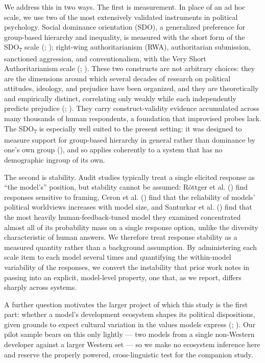 \documentclass[
]{article}
\begin{document}
We address this in two ways. The first is measurement. In place of an ad
hoc scale, we use two of the most extensively validated instruments in
political psychology. Social dominance orientation (SDO), a generalized
preference for group-based hierarchy and inequality, is measured with
the short form of the SDO\textsubscript{7} scale
(;
); right-wing
authoritarianism (RWA), authoritarian submission, sanctioned aggression,
and conventionalism, with the Very Short Authoritarianism scale
(;
). These two
constructs are not arbitrary choices: they are the dimensions around
which several decades of research on political attitudes, ideology, and
prejudice have been organized, and they are theoretically and
empirically distinct, correlating only weakly while each independently
predicts prejudice (;
). They carry
construct-validity evidence accumulated across many thousands of human
respondents, a foundation that improvised probes lack. The
SDO\textsubscript{7} is especially well suited to the present setting:
it was designed to measure support for group-based hierarchy in general
rather than dominance by one's own group (), and so applies coherently to a system that has no
demographic ingroup of its own.

The second is stability. Audit studies typically treat a single elicited
response as ``the model's'' position, but stability cannot be assumed:
Röttger et al. () find responses
sensitive to framing, Ceron et al. () find
that the reliability of models' political worldviews increases with
model size, and Santurkar et al. ()
find that the most heavily human-feedback-tuned model they examined
concentrated almost all of its probability mass on a single response
option, unlike the diversity characteristic of human answers. We
therefore treat response stability as a measured quantity rather than a
background assumption. By administering each scale item to each model
several times and quantifying the within-model variability of the
responses, we convert the instability that prior work notes in passing
into an explicit, model-level property, one that, as we report, differs
sharply across systems.

A further question motivates the larger project of which this study is
the first part: whether a model's development ecosystem shapes its
political dispositions, given grounds to expect cultural variation in
the values models express (;
). Our pilot sample bears on
this only lightly --- two models from a single non-Western developer
against a larger Western set --- so we make no ecosystem inference here
and reserve the properly powered, cross-linguistic test for the
companion study.
\end{document}
